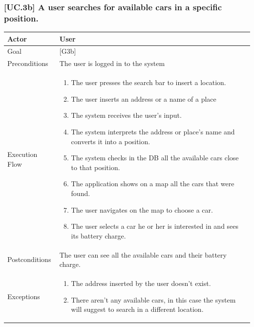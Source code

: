 \documentclass[english]{article}
\begin{document}
	\subsubsection{[UC.3b] A user searches for available cars in a specific position.}
	\begin{tabularx}{\textwidth}{  l  X  }
		\hline
		Actor & User\\
		\hline
		Goal & [G3b]\\
		\hline
		Preconditions & The user is logged in to the system\\
		\hline
		Execution Flow & \begin{enumerate}
			\item{The user presses the search bar to insert a location.}
			\item{The user inserts an address or a name of a place}
			\item{The system receives the user's input.}
			\item{The system interprets the address or place's name and converts it into a position.}
			\item{The system checks in the DB all the available cars close to that position.}
			\item{The application shows on a map all the cars that were found.}
			\item{The user navigates on the map to choose a car.}
			\item{The user selects a car he or her is interested in and sees its battery charge.}
		\end{enumerate}\\
		\hline
		Postconditions & The user can see all the available cars and their battery charge.\\
		\hline
		Exceptions & \begin{enumerate}
			\item{The address inserted by the user doesn't exist.}
			\item{There aren't any available cars, in this case the system will suggest to search in a different location.}
		\end{enumerate}\\
		\hline
	\end{tabularx}
\end{document}
